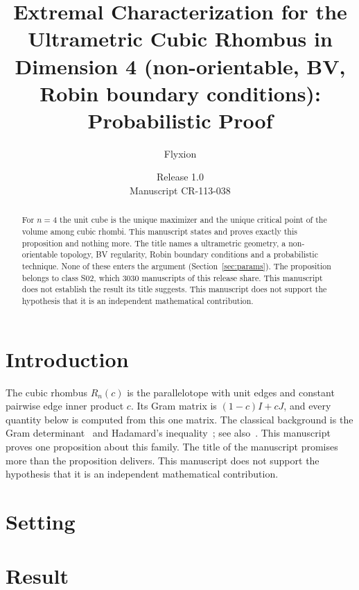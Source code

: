 \documentclass[11pt]{article}
\title{Extremal Characterization for the Ultrametric Cubic Rhombus in Dimension 4 (non-orientable, BV, Robin boundary conditions): Probabilistic Proof}
\author{Flyxion}
\date{Release 1.0\\ Manuscript CR-113-038}
\begin{document}
\maketitle
\begin{abstract}
For $n=4$ the unit cube is the unique maximizer and the unique critical point of the volume among cubic rhombi. This manuscript states and proves exactly this proposition and nothing more. The title names a ultrametric geometry, a non-orientable topology, BV regularity, Robin boundary conditions and a probabilistic technique. None of these enters the argument (Section~\ref{sec:params}). The proposition belongs to class S02, which 3030 manuscripts of this release share. This manuscript does not establish the result its title suggests. This manuscript does not support the hypothesis that it is an independent mathematical contribution.
\end{abstract}

\section{Introduction}
The cubic rhombus $R_n(c)$ is the parallelotope with unit edges and constant pairwise edge inner product $c$. Its Gram matrix is $(1-c)I+cJ$, and every quantity below is computed from this one matrix. The classical background is the Gram determinant~\cite{gram} and Hadamard's inequality~\cite{hadamard}; see also~\cite{hj}.
This manuscript proves one proposition about this family. The title of the manuscript promises more than the proposition delivers. This manuscript does not support the hypothesis that it is an independent mathematical contribution.

\section{Setting}


\section{Result}

\end{document}
